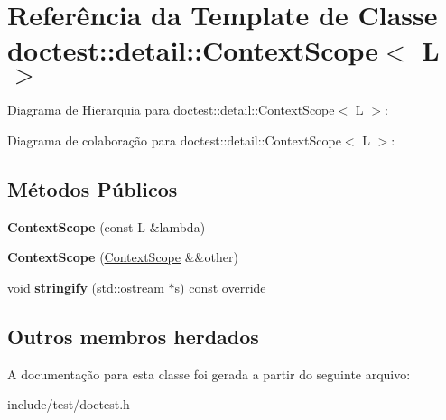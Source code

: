 \hypertarget{classdoctest_1_1detail_1_1ContextScope}{}\section{Referência da Template de Classe doctest\+:\+:detail\+:\+:Context\+Scope$<$ L $>$}
\label{classdoctest_1_1detail_1_1ContextScope}


Diagrama de Hierarquia para doctest\+:\+:detail\+:\+:Context\+Scope$<$ L $>$\+:


Diagrama de colaboração para doctest\+:\+:detail\+:\+:Context\+Scope$<$ L $>$\+:
\subsection*{Métodos Públicos}
\begin{DoxyCompactItemize}
\item 
\mbox{\label{classdoctest_1_1detail_1_1ContextScope_a344c76a0374615d567a084c0a0ffd215}} 
{\bfseries Context\+Scope} (const L \&lambda)
\item 
\mbox{\label{classdoctest_1_1detail_1_1ContextScope_afca3228fdeb0e86257a21f826c4247ff}} 
{\bfseries Context\+Scope} (\hyperlink{classdoctest_1_1detail_1_1ContextScope}{Context\+Scope} \&\&other)
\item 
\mbox{\label{classdoctest_1_1detail_1_1ContextScope_a4636ac32ae41ae108c7ada4a164ffaeb}} 
void {\bfseries stringify} (std\+::ostream $\ast$s) const override
\end{DoxyCompactItemize}
\subsection*{Outros membros herdados}


A documentação para esta classe foi gerada a partir do seguinte arquivo\+:\begin{DoxyCompactItemize}
\item 
include/test/doctest.\+h\end{DoxyCompactItemize}
